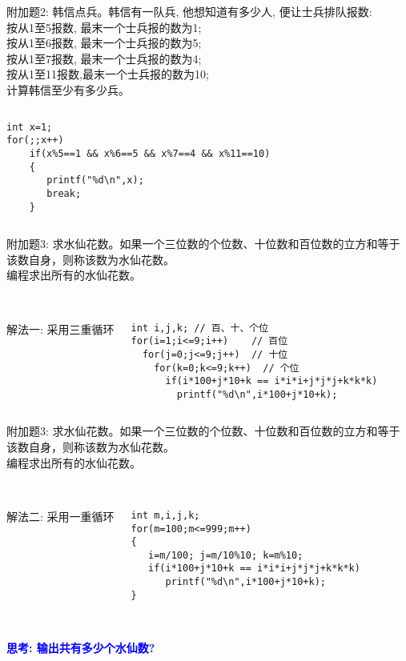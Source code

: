 \begin{frame}[fragile]
\small
附加题2: 韩信点兵。韩信有一队兵, 他想知道有多少人, 便让士兵排队报数:\\
按从1至5报数, 最末一个士兵报的数为1;\\
按从1至6报数, 最末一个士兵报的数为5;\\
按从1至7报数, 最末一个士兵报的数为4;\\
按从1至11报数,最末一个士兵报的数为10;\\ 
计算韩信至少有多少兵。 
\pause
\begin{columns}
\begin{lstlisting}
int x=1;
for(;;x++)  
    if(x%5==1 && x%6==5 && x%7==4 && x%11==10)
    { 
       printf("%d\n",x);  
       break;
    }
\end{lstlisting}
\end{columns}
\end{frame}

\begin{frame}[fragile]
附加题3: 求水仙花数。如果一个三位数的个位数、十位数和百位数的立方和等于该数自身，则称该数为水仙花数。 \\
编程求出所有的水仙花数。\\
~\\  
\pause
\begin{columns}
解法一: 采用三重循环
\begin{lstlisting}
int i,j,k; // 百、十、个位
for(i=1;i<=9;i++)    // 百位
  for(j=0;j<=9;j++)  // 十位
    for(k=0;k<=9;k++)  // 个位
      if(i*100+j*10+k == i*i*i+j*j*j+k*k*k)  
        printf("%d\n",i*100+j*10+k);
\end{lstlisting}
\end{columns}
\end{frame}

\begin{frame}[fragile]
附加题3: 求水仙花数。如果一个三位数的个位数、十位数和百位数的立方和等于该数自身，则称该数为水仙花数。 \\
编程求出所有的水仙花数。\\
~\\ 
\pause
\begin{columns}
解法二: 采用一重循环
\begin{lstlisting}
int m,i,j,k; 
for(m=100;m<=999;m++)
{
   i=m/100; j=m/10%10; k=m%10;  
   if(i*100+j*10+k == i*i*i+j*j*j+k*k*k)  
      printf("%d\n",i*100+j*10+k);
}
\end{lstlisting}
\end{columns}
~\\
\pause
\textbf{\textcolor{blue}{思考: 输出共有多少个水仙数?}}
\end{frame}

